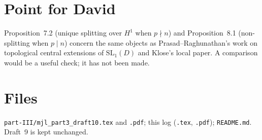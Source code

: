 \documentclass[11pt]{article}
\begin{document}
\section*{Point for David}
Proposition~7.2 (unique splitting over $H^1$ when $p\nmid n$) and
Proposition~8.1 (non-splitting when $p\mid n$) concern the same
objects as Prasad--Raghunathan's work on topological central
extensions of $\mathrm{SL}_1(D)$ and Klose's local paper.  A comparison
would be a useful check; it has not been made.

\section*{Files}
\texttt{part-III/mjl\_part3\_draft10.tex} and \texttt{.pdf}; this log
(\texttt{.tex}, \texttt{.pdf}); \texttt{README.md}.  Draft~9 is kept
unchanged.
\end{document}
